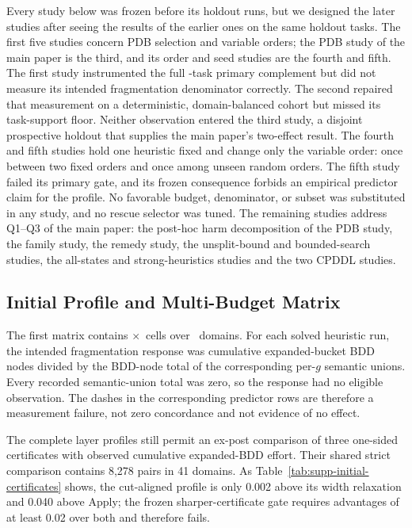 \documentclass[letterpaper]{article}
\theoremstyle{plain}
\theoremstyle{definition}
\theoremstyle{remark}
\begin{document}
Every study below was frozen before its holdout runs, but we designed the
later studies after seeing the results of the earlier ones on the same
holdout tasks.  The first five studies concern PDB selection and variable
orders; the PDB study of the main paper is the third, and its order and seed
studies are the fourth and fifth.  The first study instrumented the full \ProfileTasks-task primary
complement but did not measure its intended fragmentation denominator
correctly.  The second repaired that measurement on a deterministic,
domain-balanced cohort but missed its task-support floor.  Neither
observation entered the third study, a disjoint prospective holdout that
supplies the main paper's two-effect result.  The fourth and fifth studies
hold one heuristic fixed and change only the variable order: once between two
fixed orders and once among unseen random orders.  The fifth study failed its
primary gate, and its frozen consequence forbids an empirical predictor claim
for the profile.  No favorable budget, denominator, or subset was substituted
in any study, and no rescue selector was tuned.  The remaining studies
address Q1--Q3 of the main paper: the post-hoc harm decomposition of the PDB
study, the family study, the remedy study, the unsplit-bound and
bounded-search studies, the all-states and strong-heuristics studies and the
two CPDDL studies.

\subsection{Initial Profile and Multi-Budget Matrix}

The first matrix contains \ProfileTasks$\times$\ProfileConfigurations\ cells
over \ProfileDomains\ domains.  For each solved heuristic run, the intended
fragmentation response was cumulative expanded-bucket BDD nodes divided by
the BDD-node total of the corresponding per-$g$ semantic unions.  Every
recorded semantic-union total was zero, so the response had no eligible
observation.  The dashes in the corresponding predictor rows are therefore a
measurement failure, not zero concordance and not evidence of no effect.

The complete layer profiles still permit an ex-post comparison of three
one-sided certificates with observed cumulative expanded-BDD effort.  Their
shared strict comparison contains 8,278 pairs in 41 domains.  As
Table~\ref{tab:supp-initial-certificates} shows, the cut-aligned profile is
only 0.002 above its width relaxation and 0.040 above Apply; the frozen
sharper-certificate gate requires advantages of at least 0.02 over both and
therefore fails.
\end{document}
